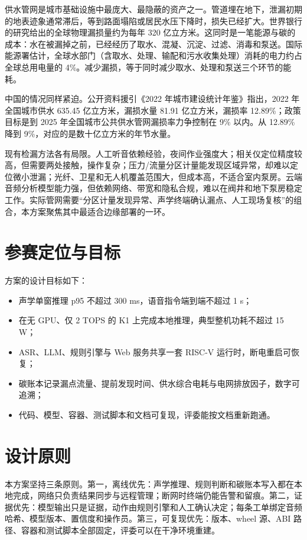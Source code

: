 \documentclass[lang=cn,11pt,scheme=chinese,chinesefont=nofont,color=green]{elegantbook}
\begin{document}
供水管网是城市基础设施中最庞大、最隐蔽的资产之一。管道埋在地下，泄漏初期的地表迹象通常滞后，等到路面塌陷或居民水压下降时，损失已经扩大。世界银行的研究给出的全球物理漏损量约为每年 320 亿立方米\cite{worldbank}。这同时是一笔能源与碳的成本：水在被漏掉之前，已经经历了取水、混凝、沉淀、过滤、消毒和泵送。国际能源署估计，全球水部门（含取水、处理、输配和污水收集处理）消耗的电力约占全球总用电量的 4\%\cite{iea}。减少漏损，等于同时减少取水、处理和泵送三个环节的能耗。

中国的情况同样紧迫。公开资料援引《2022 年城市建设统计年鉴》指出，2022 年全国城市供水 635.45 亿立方米，漏损水量 81.91 亿立方米，漏损率 12.89\%；政策目标是到 2025 年全国城市公共供水管网漏损率力争控制在 9\% 以内\cite{mohurd}。从 12.89\% 降到 9\%，对应的是数十亿立方米的年节水量。

现有检漏方法各有局限。人工听音依赖经验，夜间作业强度大；相关仪定位精度较高，但需要两处接触，操作复杂；压力/流量分区计量能发现区域异常，却难以定位微小泄漏；光纤、卫星和无人机覆盖范围大，但成本高，不适合室内泵房。云端音频分析模型能力强，但依赖网络、带宽和隐私合规，难以在阀井和地下泵房稳定工作。实际管网需要“分区计量发现异常、声学终端确认漏点、人工现场复核”的组合，本方案聚焦其中最适合边缘部署的一环。

\section{参赛定位与目标}

方案的设计目标如下：

\begin{itemize}
  \item 声学单窗推理 p95 不超过 300 ms，语音指令端到端不超过 1 s；
  \item 在无 GPU、仅 2 TOPS 的 K1 上完成本地推理，典型整机功耗不超过 15 W；
  \item ASR、LLM、规则引擎与 Web 服务共享一套 RISC-V 运行时，断电重启可恢复；
  \item 碳账本记录漏点流量、提前发现时间、供水综合电耗与电网排放因子，数字可追溯；
  \item 代码、模型、容器、测试脚本和文档可复现，评委能按文档重新跑通。
\end{itemize}

\section{设计原则}

本方案坚持三条原则。第一，离线优先：声学推理、规则判断和碳账本写入都在本地完成，网络只负责结果同步与远程管理；断网时终端仍能告警和留痕。第二，证据优先：模型输出只是证据，动作由规则引擎和人工确认决定；每条工单绑定音频哈希、模型版本、置信度和操作员。第三，可复现优先：版本、wheel 源、ABI 路径、容器和测试脚本全部固定，评委可以在干净环境重建。
\end{document}
